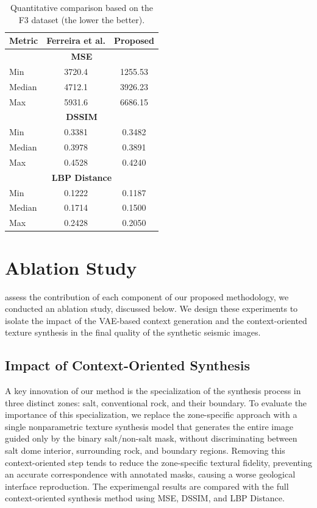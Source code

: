\documentclass{ieeeaccess}
\begin{document}
\begin{table}[htbp]
    \centering
    \caption{Quantitative comparison based on the F3 dataset (the lower the better).}
    \label{tab:metricsSummary}
    \begin{tabular}{lcc}
        \toprule
        \textbf{Metric} & \textbf{Ferreira et al.} & \textbf{Proposed} \\
        \midrule
        \multicolumn{3}{c}{\textbf{MSE}} \\
        Min & 3720.4 & 1255.53 \\
        Median & 4712.1 & 3926.23 \\
        Max & 5931.6 & 6686.15 \\
        \midrule
        \multicolumn{3}{c}{\textbf{DSSIM}} \\
        Min & 0.3381 & 0.3482 \\
        Median & 0.3978 & 0.3891 \\
        Max & 0.4528 & 0.4240 \\
        \midrule
        \multicolumn{3}{c}{\textbf{LBP Distance}} \\
        Min & 0.1222 & 0.1187 \\
        Median & 0.1714 & 0.1500 \\
        Max & 0.2428 & 0.2050 \\
        \bottomrule
    \end{tabular}
\end{table}

\newpage
\section{Ablation Study}
\label{sec:ablation}

 assess the contribution of each component of our proposed methodology, we conducted an ablation study, discussed below. We design these experiments to isolate the impact of the VAE-based context generation and the context-oriented texture synthesis in the final quality of the synthetic seismic images.

\subsection{Impact of Context-Oriented Synthesis}

A key innovation of our method is the specialization of the synthesis process in three distinct zones: salt, conventional rock, and their boundary. To evaluate the importance of this specialization, we replace the zone-specific approach with a single nonparametric texture synthesis model that generates the entire image guided only by the binary salt/non-salt mask, without discriminating between salt dome interior, surrounding rock, and boundary regions. Removing this context-oriented step tends to reduce the zone-specific textural fidelity, preventing an accurate correspondence with annotated masks, causing a worse geological interface reproduction. The experimengal results are compared with the full context-oriented synthesis method using MSE, DSSIM, and LBP Distance.
\end{document}
